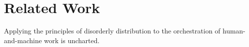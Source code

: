 
\section*{Related Work}
\label{sec:relatedwork}

Applying the principles of disorderly distribution to the orchestration of human-and-machine work is uncharted.
